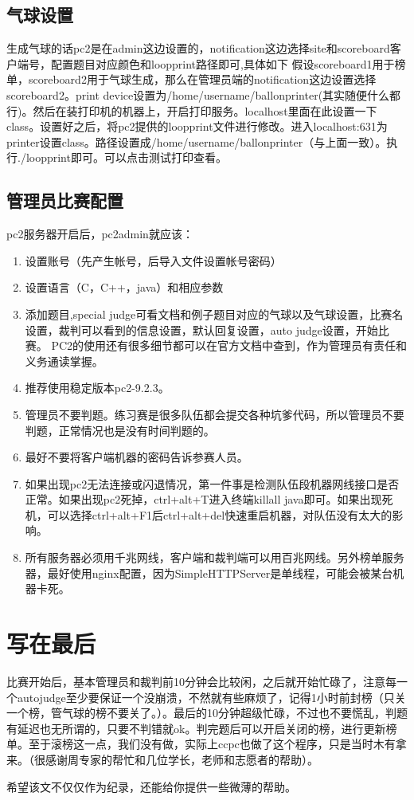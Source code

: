 \documentclass[12pt]{article}
\begin{document}
\subsection{气球设置}
生成气球的话pc2是在admin这边设置的，notification这边选择site和scoreboard客户端号，配置题目对应颜色和loopprint路径即可,具体如下
假设scoreboard1用于榜单，scoreboard2用于气球生成，那么在管理员端的notification这边设置选择scoreboard2。print device设置为/home/username/ballonprinter(其实随便什么都行)。然后在装打印机的机器上，开启打印服务。localhost里面在此设置一下class。设置好之后，将pc2提供的loopprint文件进行修改。进入localhost:631为printer设置class。路径设置成/home/username/ballonprinter（与上面一致）。执行./loopprint即可。可以点击测试打印查看。


\subsection{管理员比赛配置}
pc2服务器开启后，pc2admin就应该：
\begin{enumerate}
\item
设置账号（先产生帐号，后导入文件设置帐号密码）
\item
设置语言（C，C++，java）和相应参数
\item
添加题目,special judge可看文档和例子题目对应的气球以及气球设置，比赛名设置，裁判可以看到的信息设置，默认回复设置，auto judge设置，开始比赛。
PC2的使用还有很多细节都可以在官方文档中查到，作为管理员有责任和义务通读掌握。
\item
推荐使用稳定版本pc2-9.2.3。
\item
管理员不要判题。练习赛是很多队伍都会提交各种坑爹代码，所以管理员不要判题，正常情况也是没有时间判题的。
\item
最好不要将客户端机器的密码告诉参赛人员。
\item
如果出现pc2无法连接或闪退情况，第一件事是检测队伍段机器网线接口是否正常。如果出现pc2死掉，ctrl+alt+T进入终端killall java即可。如果出现死机，可以选择ctrl+alt+F1后ctrl+alt+del快速重启机器，对队伍没有太大的影响。
\item
所有服务器必须用千兆网线，客户端和裁判端可以用百兆网线。另外榜单服务器，最好使用nginx配置，因为SimpleHTTPServer是单线程，可能会被某台机器卡死。

\end{enumerate}


\section{写在最后}

比赛开始后，基本管理员和裁判前10分钟会比较闲，之后就开始忙碌了，注意每一个autojudge至少要保证一个没崩溃，不然就有些麻烦了，记得1小时前封榜（只关一个榜，管气球的榜不要关了。）。最后的10分钟超级忙碌，不过也不要慌乱，判题有延迟也无所谓的，只要不判错就ok。判完题后可以开启关闭的榜，进行更新榜单。至于滚榜这一点，我们没有做，实际上ccpc也做了这个程序，只是当时木有拿来。（很感谢周专家的帮忙和几位学长，老师和志愿者的帮助）。

希望该文不仅仅作为纪录，还能给你提供一些微薄的帮助。
\end{document}
